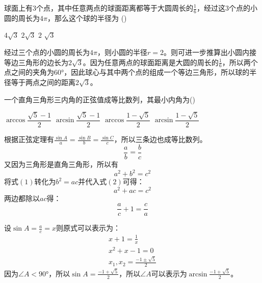 \documentclass[answers]{exam}
\begin{document}
\begin{questions}
	\question
	球面上有$3$个点，其中任意两点的球面距离都等于大圆周长的$\frac16$，经过这$3$个点的小圆的周长为$4\pi$，那么这个球的半径为
	\hfill (\hspace{1cm})

	\begin{oneparchoices}
		\choice $4\sqrt{3}$
		\CorrectChoice $2\sqrt{3}$
		\choice $2$
		\choice $\sqrt{3}$
	\end{oneparchoices}

	\begin{solution}
		经过三个点的小圆的周长为$4\pi$，则小圆的半径$r=2$。则可进一步推算出小圆内接等边三角形的边长为$2\sqrt{3}$。因为任意两点的球面距离是大圆的周长的$\frac16$，所以两个点之间的夹角为$\ang{60}$，因此球心与其中两个点的组成一个等边三角形，所以球的半径等于两点之间的距离$2\sqrt{3}$。
	\end{solution}

	\question 一个直角三角形三内角的正弦值成等比数列，其最小内角为\hfill (\hspace{1cm})

	\begin{oneparchoices}
		\choice $\arccos\dfrac{\sqrt{5}-1}{2}$
		\CorrectChoice $\arcsin\dfrac{\sqrt{5}-1}{2}$
		\choice $\arccos\dfrac{1-\sqrt{5}}{2}$
		\choice $\arcsin\dfrac{1-\sqrt{5}}{2}$
	\end{oneparchoices}

	\begin{solution}
		根据正弦定理有$\frac{\sin A}{a}=\frac{\sin B}{b}=\frac{\sin C}{c}$，所以三条边也成等比数列。
		\begin{equation*}
			\frac{a}{b} = \frac{b}{c} \tag{1}
		\end{equation*}
		又因为三角形是直角三角形，所以有
		\begin{equation*}
			a^2 + b^2 = c^2 \tag{2}
		\end{equation*}
		将式$(1)$转化为$b^2=ac$并代入式$(2)$可得：
		\begin{equation*}
			a^2 + ac = c^2
		\end{equation*}
		两边都除以$ac$得：
		\begin{equation*}
			\frac{a}{c} + 1 = \frac{c}{a}
		\end{equation*}

		设$\sin{A}=\frac{a}{c}=x$则原式可以表示为：
		\begin{align*}
			x + 1 = \frac{1}{x} \\
			x^2 + x - 1 = 0     \\
			x_1,x_2 = \frac{-1\pm\sqrt{5}}{2}
		\end{align*}
		因为$\angle{A}<\ang{90}$，所以$\sin{A}=\frac{-1+\sqrt{5}}{2}$，所以$\angle{A}$可以表示为$\arcsin{\frac{-1+\sqrt{5}}{2}}$。
	\end{solution}


\end{questions}
\end{document}
